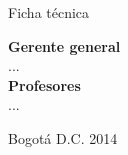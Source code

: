 \newpage
\vfill
\begin{center}
\begin{Huge}
Ficha técnica
\end{Huge}
\vfill
\par
\textbf{Gerente general}\\
...\\
\textbf{Profesores}\\
...
\par

\vfill
Bogotá D.C. 2014

\end{center}
\vfill